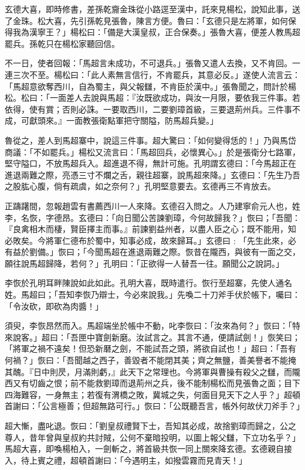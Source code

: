 玄德大喜，即時修書，差孫乾齎金珠從小路逕至漢中，託來見楊松，說知此事，送了金珠。松大喜，先引孫乾見張魯，陳言方便。魯曰：「玄德只是左將軍，如何保得我為漢寧王？」楊松曰：「備是大漢皇叔，正合保奏。」張魯大喜，便差人教馬超罷兵。孫乾只在楊松家聽回信。

不一日，使者回報：「馬超言未成功，不可退兵。」張魯又遣人去換，又不肯回。一連三次不至。楊松曰：「此人素無言信行，不肯罷兵，其意必反。」遂使人流言云：「馬超意欲奪西川，自為蜀主，與父報讎，不肯臣於漢中。」張魯聞之，問計於楊松。松曰：「一面差人去說與馬超：『汝既欲成功，與汝一月限，要依我三件事。若依得，使有賞；否則必誅。一要取西川，二要劉璋首級，三要退荊州兵。三件事不成，可獻頭來。』一面教張衛點軍把守關隘，防馬超兵變。」

魯從之，差人到馬超寨中，說這三件事。超大驚曰：「如何變得恁的！」乃與馬岱商議：「不如罷兵。」楊松又流言曰：「馬超回兵，必懷異心。」於是張衛分七路軍，堅守隘口，不放馬超兵入。超進退不得，無計可施。孔明謂玄德曰：「今馬超正在進退兩難之際，亮憑三寸不爛之舌，親往超寨，說馬超來降。」玄德曰：「先生乃吾之股肱心腹，倘有疏虞，如之奈何？」孔明堅意要去。玄德再三不肯放去。

正躊躇間，忽報趙雲有書薦西川一人來降。玄德召入問之。人乃建寧俞元人也，姓李，名恢，字德昂。玄德曰：「向日聞公苦諫劉璋，今何故歸我？」恢曰；「吾聞：『良禽相木而棲，賢臣擇主而事。』前諫劉益州者，以盡人臣之心；既不能用，知必敗矣。今將軍仁德布於蜀中，知事必成，故來歸耳。」玄德曰﹕「先生此來，必有益於劉備。」恢曰；「今聞馬超在進退兩難之際。恢昔在隴西，與彼有一面之交，願往說馬超歸降，若何？」孔明曰：「正欲得一人替吾一往。願聞公之說詞。」

李恢於孔明耳畔陳說如此如此。孔明大喜，既時遣行。恢行至超寨，先使人通名姓。馬超曰；「吾知李恢乃辯士，今必來說我。」先喚二十刀斧手伏於帳下，囑曰：「令汝砍，即砍為肉醬！」

須臾，李恢昂然而入。馬超端坐於帳中不動，叱李恢曰：「汝來為何？」恢曰：「特來說客。」超曰：「吾匣中寶劍新磨。汝試言之。其言不通，便請試劍！」恢笑曰；「將軍之禍不遠矣！但恐新磿之劍，不能試吾之頭，將欲自試也！」超曰：「吾有何禍？」恢曰：「吾聞越之西子，善毀者不能閉其美；齊之無鹽，善美譽者不能掩其醜。『日中則昃，月滿則虧，』此天下之常理也。今將軍與曹操有殺父之讎，而隴西又有切齒之恨；前不能救劉璋而退荊州之兵，後不能制楊松而見張魯之面；目下四海難容，一身無主；若復有渭橋之敗，冀城之失，何面目見天下之人乎？」超頓首謝曰：「公言極善；但超無路可行。」恢曰：「公既聽吾言，帳外何故伏刀斧手？」

超大慚，盡叱退。恢曰：「劉皇叔禮賢下士，吾知其必成，故捨劉璋而歸之，公之尊人，昔年曾與皇叔約共討賊，公何不棄暗投明，以圖上報父讎，下立功名乎？」馬超大喜，即喚楊柏入，一劍斬之，將首級共恢一同上關來降玄德。玄德親自接入，待上賓之禮，超頓首謝曰：「今遇明主，如撥雲霧而見青天！」

